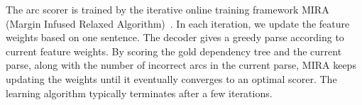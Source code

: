 The arc scorer is trained by the iterative online
training framework MIRA (Margin Infused Relaxed Algorithm)~\cite{crammer2003ultraconservative}.
In each iteration, we update the feature weights based on one sentence. The
decoder gives a greedy parse according to current feature weights.
By scoring the gold dependency tree and the current parse,
along with the number of incorrect arcs in the current parse,
MIRA keeps updating the weights until it eventually converges to an optimal scorer.
The learning algorithm typically terminates after a few iterations.

